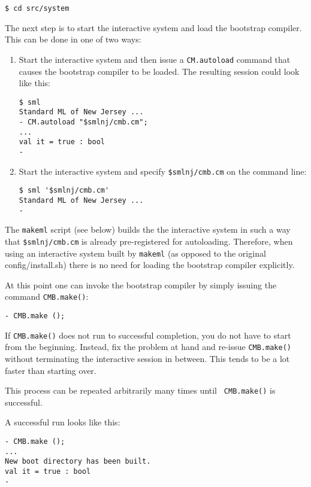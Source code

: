 \begin{verbatim}
$ cd src/system
\end{verbatim}

The next step is to start the interactive system and load the
bootstrap compiler.  This can be done in one of two ways:

\begin{enumerate}
\item Start the interactive system and then issue a {\tt CM.autoload}
command that causes the bootstrap compiler to be loaded. The resulting
session could look like this:
\begin{verbatim}
$ sml
Standard ML of New Jersey ...
- CM.autoload "$smlnj/cmb.cm";
...
val it = true : bool
-
\end{verbatim}
\item Start the interactive system and specify {\tt \$smlnj/cmb.cm} on
the command line:
\begin{verbatim}
$ sml '$smlnj/cmb.cm'
Standard ML of New Jersey ...
-  
\end{verbatim}
\end{enumerate}

 The {\tt makeml}
script (see below) builds the the interactive system in such a way
that {\tt \$smlnj/cmb.cm} is already pre-registered for autoloading.
Therefore, when using an interactive system built by {\tt makeml}
(as opposed to the original config/install.sh) there is no need
for loading the bootstrap compiler explicitly.

At this point one can invoke the bootstrap compiler by simply issuing
the command {\tt CMB.make()}:

\begin{verbatim}
- CMB.make ();
\end{verbatim}

If {\tt CMB.make()} does not run to successful completion, you do not
have to start from the beginning.  Instead, fix the problem at hand
and re-issue {\tt CMB.make()} without terminating the interactive
session in between.  This tends to be a lot faster than starting over.

This process can be repeated arbitrarily many times until {\tt
CMB.make()} is successful.

A successful run looks like this:

\begin{verbatim}
- CMB.make ();
...
New boot directory has been built.
val it = true : bool
- 
\end{verbatim}

